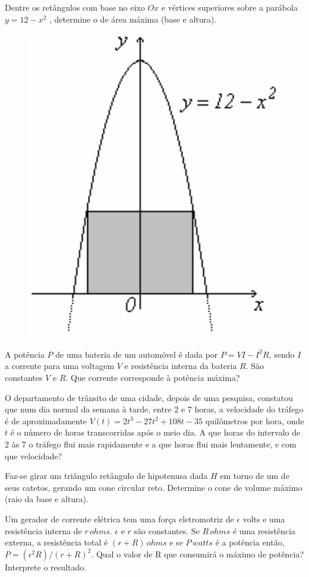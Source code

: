 \cleardoublepage\documentclass[../main.tex]{subfiles}
\begin{document}
\begin{exer}
Dentre os retângulos com base no eixo $Ox$ e vértices superiores sobre a parábola $y = 12 - x^2$ , determine o de área máxima (base e altura). 
\begin{figure}[H]
    \centering
    \includegraphics[scale=0.55]{fig_apl_deriv/Otmiz-ParabAreaRet.png}
    \end{figure}
\end{exer}
\begin{exer}
 A potência $P$ de uma bateria de um automóvel é dada por $P = V I - I^2 R$, sendo $I$ a corrente para uma voltagem $V$ e resistência interna da bateria $R$. São constantes $V$ e $R$. Que corrente corresponde à potência máxima?
 \end{exer}
\begin{exer}
O departamento de trânsito de uma cidade, depois de uma pesquisa, constatou que num dia normal da semana à tarde, entre 2 e 7 horas, a velocidade do tráfego é de aproximadamente $V(t)=2t^3-27t^2+108t-35$ quilômetros por hora, onde $t $ é o número de horas transcorridas após o meio dia. A que horas do intervalo de 2 às 7 o tráfego flui mais rapidamente e a que horas flui mais  lentamente, e com que velocidade? 
\end{exer}
\begin{exer}
 Faz-se girar um triângulo retângulo de hipotenusa dada $H$ em torno de um de seus catetos, gerando um cone circular reto. Determine o cone de volume máximo (raio da base e altura). 
 \end{exer}
\begin{exer}
Um gerador de corrente elétrica tem uma força eletromotriz de $\epsilon$ volts e uma resistência interna de $r\, ohms$. $\epsilon$ e $r$ são constantes. Se $R\, ohms$ é uma resistência externa, a resistência total é $(r + R)\,
ohms$ e se $P\, watts$ é a potência então, $P=(\epsilon^2R)/(r+R)^2$. Qual o valor de R que consumirá o máximo
de potência? Interprete o resultado. 
\end{exer}
\end{document}
